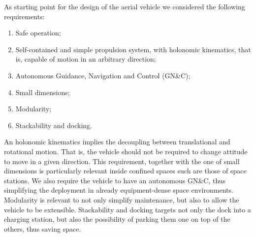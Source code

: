 
As starting point for the design of the aerial vehicle we considered
the following requirements:
\begin{enumerate}
\itemsep=0em
\item Safe operation;
\item Self-contained and simple propulsion system, with holonomic
  kinematics, that is, capable of motion in an arbitrary direction;
\item Autonomous Guidance, Navigation and Control (GN\&C);
\item Small dimensions;
\item Modularity;
\item Stackability and docking.
\end{enumerate}
An holonomic kinematics implies the decoupling between translational
and rotational motion. That is, the vehicle should not be required to
change attitude to move in a given direction. This requirement,
together with the one of small dimensions is particularly relevant
inside confined spaces such are those of space stations. We also
require the vehicle to have an autonomous GN\&C, thus simplifying the
deployment in already equipment-dense space environments. Modularity is
relevant to not only simplify maintenance, but also to allow the vehicle
to be extensible. Stackability and docking targets not only the dock
into a charging station, but also the possibility of parking them one
 on top of the others, thus saving space.

